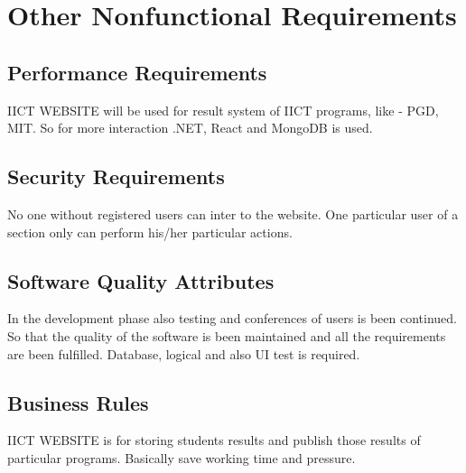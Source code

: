\documentclass[../main.tex]{subfiles}
\begin{document}
\chapter{Other Nonfunctional Requirements}

\section{Performance Requirements}
IICT WEBSITE will be used for result system of IICT programs, like - PGD, MIT. So for more interaction .NET, React and MongoDB is used. 

\section{Security Requirements}
No one without registered users can inter to the website. One particular user of a section only can perform his/her particular actions. 

\section{Software Quality Attributes}
In the development phase also testing and conferences of users is been continued. So that the quality of the software is been maintained and all the requirements are been fulfilled.
\newline
Database, logical and also UI test is required. 

\section{Business Rules}
IICT WEBSITE is for storing students results and publish those results of particular programs.
\newline
Basically save working time and pressure. 
\end{document}
